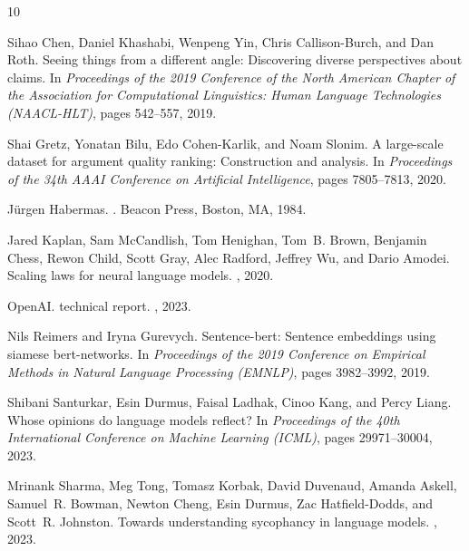 \documentclass[11pt,a4paper]{article}
\begin{document}

\begin{thebibliography}{10}

Sihao Chen, Daniel Khashabi, Wenpeng Yin, Chris Callison-Burch, and Dan Roth.
\newblock Seeing things from a different angle: Discovering diverse perspectives about claims.
\newblock In {\em Proceedings of the 2019 Conference of the North American Chapter of the Association for Computational Linguistics: Human Language Technologies (NAACL-HLT)}, pages 542--557, 2019.

Shai Gretz, Yonatan Bilu, Edo Cohen-Karlik, and Noam Slonim.
\newblock A large-scale dataset for argument quality ranking: Construction and analysis.
\newblock In {\em Proceedings of the 34th AAAI Conference on Artificial Intelligence}, pages 7805--7813, 2020.

J{\"u}rgen Habermas.
.
\newblock Beacon Press, Boston, MA, 1984.

Jared Kaplan, Sam McCandlish, Tom Henighan, Tom~B. Brown, Benjamin Chess, Rewon Child, Scott Gray, Alec Radford, Jeffrey Wu, and Dario Amodei.
\newblock Scaling laws for neural language models.
, 2020.

OpenAI.
 technical report.
, 2023.

Nils Reimers and Iryna Gurevych.
\newblock Sentence-bert: Sentence embeddings using siamese bert-networks.
\newblock In {\em Proceedings of the 2019 Conference on Empirical Methods in Natural Language Processing (EMNLP)}, pages 3982--3992, 2019.

Shibani Santurkar, Esin Durmus, Faisal Ladhak, Cinoo Kang, and Percy Liang.
\newblock Whose opinions do language models reflect?
\newblock In {\em Proceedings of the 40th International Conference on Machine Learning (ICML)}, pages 29971--30004, 2023.

Mrinank Sharma, Meg Tong, Tomasz Korbak, David Duvenaud, Amanda Askell, Samuel~R. Bowman, Newton Cheng, Esin Durmus, Zac Hatfield-Dodds, and Scott~R. Johnston.
\newblock Towards understanding sycophancy in language models.
, 2023.

\end{thebibliography}
\end{document}

